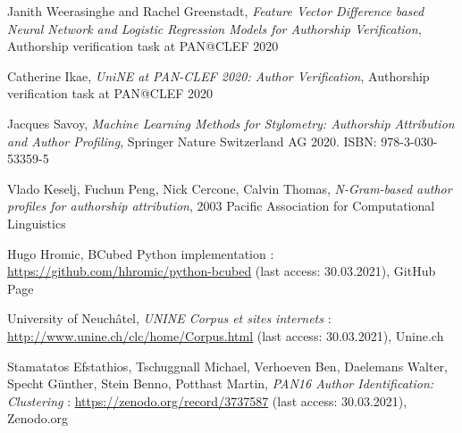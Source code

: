 \begin{thebibliography}{9}
Janith Weerasinghe and Rachel Greenstadt,
\textit{Feature Vector Difference based Neural Network and Logistic Regression Models for Authorship Verification},
Authorship verification task at PAN@CLEF 2020

Catherine Ikae,
\textit{UniNE at PAN-CLEF 2020: Author Verification},
Authorship verification task at PAN@CLEF 2020

Jacques Savoy,
\textit{Machine Learning Methods for Stylometry: Authorship Attribution and Author Profiling},
Springer Nature Switzerland AG 2020. ISBN: 978-3-030-53359-5

Vlado Keselj, Fuchun Peng, Nick Cercone, Calvin Thomas,
\textit{N-Gram-based author profiles for authorship attribution},
2003 Pacific Association for Computational Linguistics


Hugo Hromic,
BCubed Python implementation : \url{https://github.com/hhromic/python-bcubed} (last access: 30.03.2021),
GitHub Page

University of Neuchâtel,
\textit{UNINE Corpus et sites internets} : \url{http://www.unine.ch/clc/home/Corpus.html} (last access: 30.03.2021),
Unine.ch

Stamatatos Efstathios, Tschuggnall Michael, Verhoeven Ben, Daelemans Walter, Specht Günther, Stein Benno, Potthast Martin,
\textit{PAN16 Author Identification: Clustering} : \url{https://zenodo.org/record/3737587} (last access: 30.03.2021),
Zenodo.org

\end{thebibliography}
